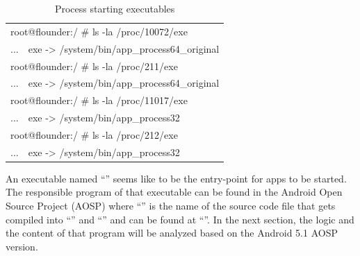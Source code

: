 \begin{table}[htb]
  \caption[Process starting executables]{Process starting executables}
  \label{tab:process_executables}
  \centering
  \begin{tabular}{l l}
    \toprule
    \multicolumn{2}{l}{root@flounder:/ \# ls -la /proc/10072/exe} \\
    ... & exe -> /system/bin/app\_process64\_original\\
    \midrule
    \multicolumn{2}{l}{root@flounder:/ \# ls -la /proc/211/exe} \\
    ... & exe -> /system/bin/app\_process64\_original\\
    \midrule
    \multicolumn{2}{l}{root@flounder:/ \# ls -la /proc/11017/exe} \\
    ... & exe -> /system/bin/app\_process32\\
    \midrule
    \multicolumn{2}{l}{root@flounder:/ \# ls -la /proc/212/exe} \\
    ... & exe -> /system/bin/app\_process32\\
    \bottomrule
  \end{tabular}
\end{table}

An executable named ``'' seems like to be the entry-point for apps to be started. The responsible program of that executable
can be found in the Android Open Source Project (AOSP) where
``'' is the name of the source code file that gets
compiled into ``'' and ``''
and can be found at ``''.
In the next section, the logic and the content of that program will be analyzed based on the Android 5.1 AOSP version.

